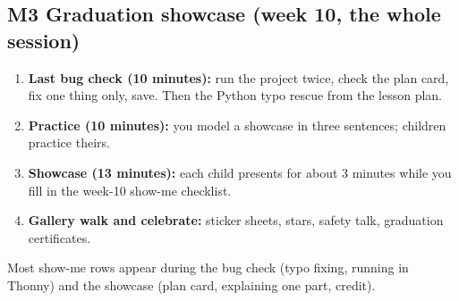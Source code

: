 \documentclass[track=junior,level=3,teacher]{kidscode}
\begin{document}
\subsection{M3 Graduation showcase (week 10, the whole session)}
\begin{enumerate}[itemsep=2pt]
  \item \textbf{Last bug check (10 minutes):} run the project twice, check the plan card, fix one thing
        only, save. Then the Python typo rescue from the lesson plan.
  \item \textbf{Practice (10 minutes):} you model a showcase in three sentences; children practice theirs.
  \item \textbf{Showcase (13 minutes):} each child presents for about 3 minutes while you fill in the
        week-10 show-me checklist.
  \item \textbf{Gallery walk and celebrate:} sticker sheets, stars, safety talk, graduation certificates.
\end{enumerate}
Most show-me rows appear during the bug check (typo fixing, running in Thonny) and the showcase
(plan card, explaining one part, credit).

\end{document}
